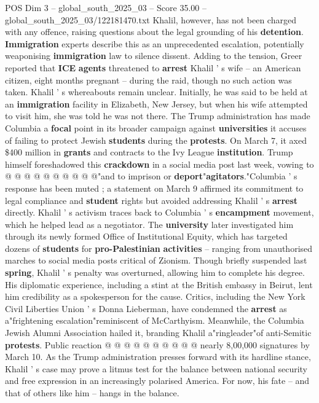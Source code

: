\begin{textsample}{POS Dim 3 – global\_south\_2025\_03 – Score 35.00 – global\_south\_2025\_03/122181470.txt}
Khalil, however, has not been charged with any offence, raising questions about the legal grounding of his \textbf{detention}. \textbf{Immigration} experts describe this as an unprecedented escalation, potentially weaponising \textbf{immigration} law to silence dissent.
Adding to the tension, Greer reported that \textbf{ICE} \textbf{agents} threatened to \textbf{arrest} Khalil ' s wife -- an American citizen, eight months pregnant -- during the raid, though no such action was taken.
Khalil ' s whereabouts remain unclear.
Initially, he was said to be held at an \textbf{immigration} facility in Elizabeth, New Jersey, but when his wife attempted to visit him, she was told he was not there.
The Trump administration has made Columbia a \textbf{focal} point in its broader campaign against \textbf{universities} it accuses of failing to protect Jewish \textbf{students} during the \textbf{protests}.
On March 7, it axed \$400 million in \textbf{grants} and contracts to the Ivy League \textbf{institution}.
Trump himself foreshadowed this \textbf{crackdown} in a social media post last week, vowing to @ @ @ @ @ @ @ @ @ @"and to imprison or \textbf{deport}"\textbf{agitators}."Columbia ' s response has been muted ; a statement on March 9 affirmed its commitment to legal compliance and \textbf{student} rights but avoided addressing Khalil ' s \textbf{arrest} directly.
Khalil ' s activism traces back to Columbia ' s \textbf{encampment} movement, which he helped lead as a negotiator.
The \textbf{university} later investigated him through its newly formed Office of Institutional Equity, which has targeted dozens of \textbf{students} for \textbf{pro-Palestinian} \textbf{activities} -- ranging from unauthorised marches to social media posts critical of Zionism.
Though briefly suspended last \textbf{spring}, Khalil ' s penalty was overturned, allowing him to complete his degree.
His diplomatic experience, including a stint at the British embassy in Beirut, lent him credibility as a spokesperson for the cause.
Critics, including the New York Civil Liberties Union ' s Donna Lieberman, have condemned the \textbf{arrest} as a"frightening escalation"reminiscent of McCarthyism.
Meanwhile, the Columbia Jewish Alumni Association hailed it, branding Khalil a"ringleader"of anti-Semitic \textbf{protests}.
Public reaction @ @ @ @ @ @ @ @ @ @ nearly 8,00,000 signatures by March 10.
As the Trump administration presses forward with its hardline stance, Khalil ' s case may prove a litmus test for the balance between national security and free expression in an increasingly polarised America.
For now, his fate -- and that of others like him -- hangs in the balance.

\end{textsample}

